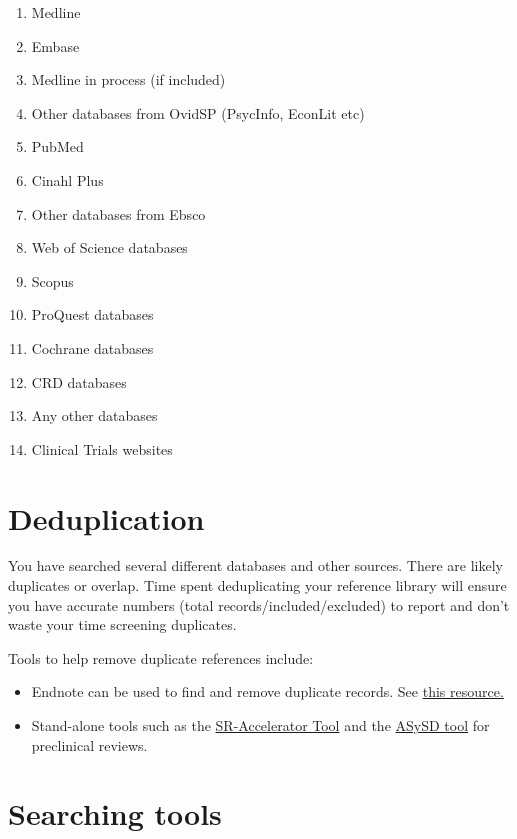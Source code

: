 \documentclass[
]{book}
\providecommand{\tightlist}{%
  \setlength{\itemsep}{0pt}\setlength{\parskip}{0pt}}
\begin{document}
\begin{enumerate}
\def\labelenumi{\arabic{enumi}.}
\tightlist
\item
  Medline
\item
  Embase
\item
  Medline in process (if included)
\item
  Other databases from OvidSP (PsycInfo, EconLit etc)
\item
  PubMed
\item
  Cinahl Plus
\item
  Other databases from Ebsco
\item
  Web of Science databases
\item
  Scopus
\item
  ProQuest databases
\item
  Cochrane databases
\item
  CRD databases
\item
  Any other databases
\item
  Clinical Trials websites
\end{enumerate}

\hypertarget{deduplication}{%
\section{Deduplication}\label{deduplication}}

You have searched several different databases and other sources. There are likely duplicates or overlap. Time spent deduplicating your reference library will ensure you have accurate numbers (total records/included/excluded) to report and don't waste your time screening duplicates.

Tools to help remove duplicate references include:

\begin{itemize}
\tightlist
\item
  Endnote can be used to find and remove duplicate records. See \href{10.3163/1536-5050.104.3.014}{this resource.}
\item
  Stand-alone tools such as the \href{https://doi.org/10.1186/2046-4053-4-6}{SR-Accelerator Tool} and the \href{https://camarades.shinyapps.io/RDedup/}{ASySD tool} for preclinical reviews.
\end{itemize}

\hypertarget{searching-tools}{%
\section{Searching tools}\label{searching-tools}}
\end{document}
